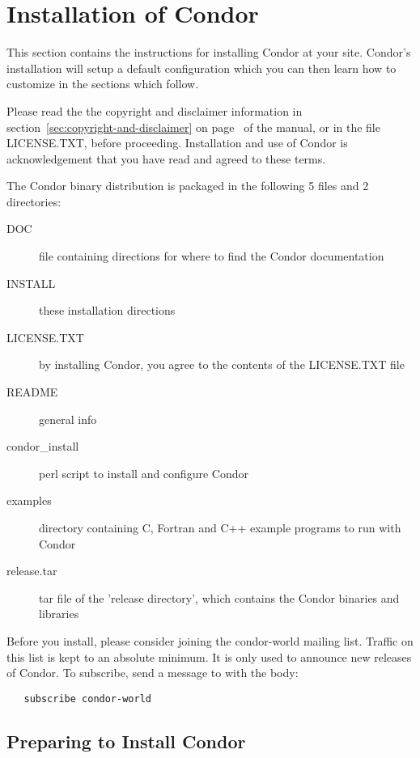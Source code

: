 \section{Installation of Condor}
\label{sec:install}

This section contains the instructions for installing Condor at your
site.  Condor's installation will setup a default configuration which
you can then learn how to customize in the sections which follow.

Please read the the copyright and disclaimer information in 
section~\ref{sec:copyright-and-disclaimer} on
page~\pageref{sec:copyright-and-disclaimer} of the manual, or in the
file LICENSE.TXT, before proceeding.  Installation and
use of Condor is acknowledgement that you have read and agreed to these
terms.

The Condor binary distribution is packaged in the following 5 files
and 2 directories:

\begin{description}
\item[DOC] file containing directions for where to find the 
		  Condor documentation
\item[INSTALL] these installation directions
\item[LICENSE.TXT] by installing Condor, you agree to the contents of
		  the LICENSE.TXT file
\item[README] general info
\item[condor\_install] perl script to install and configure Condor
\item[examples] directory containing C, Fortran and C++ example
		  programs to run with Condor
\item[release.tar] tar file of the 'release directory', which contains
		  the Condor binaries and libraries
\end{description}

Before you install, please consider joining the condor-world mailing
list.  Traffic on this list is kept to an absolute minimum.  It is only
used to announce new releases of Condor.  To subscribe, send a message
to  with the body:
\begin{verbatim}
   subscribe condor-world 
\end{verbatim}

\subsection{Preparing to Install Condor}

